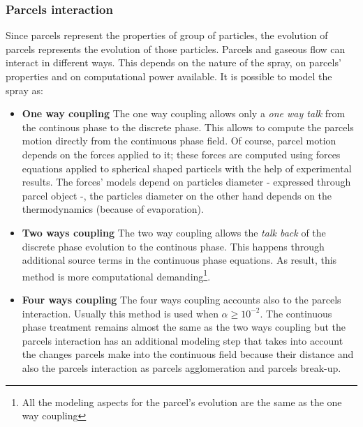     \subsubsection{Parcels interaction}
    Since parcels represent the properties of group of particles, the evolution of parcels represents the evolution of those particles. Parcels and gaseous flow can interact in different ways. This depends on the nature of the spray, on parcels' properties and on computational power available. It is possible to model the spray as:
    \begin{itemize}
        \item \textbf{One way coupling} The one way coupling allows only a \textit{one way talk} from the continous phase to the discrete phase. This allows to compute the parcels motion directly from the continuous phase field. Of course, parcel motion depends on the forces applied to it; these forces are computed using forces equations applied to spherical shaped particels with the help of experimental results. The forces' models depend on particles diameter - expressed through parcel object -, the particles diameter on the other hand depends on the thermodynamics (because of evaporation).
        \item \textbf{Two ways coupling} The two way coupling allows the \textit{talk back} of the discrete phase evolution to the continous phase. This happens through additional source terms in the continuous phase equations. As result, this method is more computational demanding\footnote{All the modeling aspects for the parcel's evolution are the same as the one way coupling}.
        \item \textbf{Four ways coupling} The four ways coupling accounts also to the parcels interaction. Usually this method is used when $\alpha \geq 10^{-2}$. The continuous phase treatment remains almost the same as the two ways coupling but the parcels interaction has an additional modeling step that takes into account the changes parcels make into the continuous field because their distance and also the parcels interaction as parcels agglomeration and parcels break-up.
    \end{itemize}

\newpage
